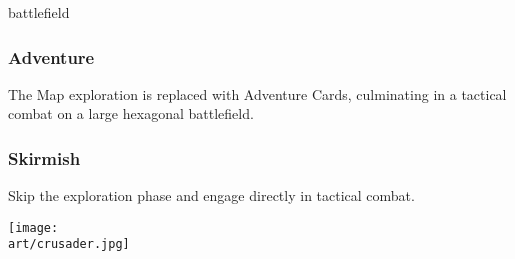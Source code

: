 \begin{multicols*}{2}
\begin{expansion}[before=\vspace*{-10mm}]{battlefield}
\subsubsection*{Adventure}
The Map exploration is replaced with Adventure Cards, culminating in a tactical combat on a large hexagonal battlefield.

\subsubsection*{Skirmish}
Skip the exploration phase and engage directly in tactical combat.
\end{expansion}

\bigskip
\vspace*{\fill}
\texttt{[image: \\art/crusader.jpg]}
\vspace*{\fill}

\end{multicols*}
